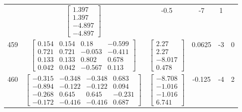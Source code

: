 \documentclass[a4paper,12pt]{article}
\begin{document}
\begin{tabular}{c c c c c c}
&
$\begin{bmatrix} 1.397 \\ 1.397 \\ -4.897 \\ -4.897 \end{bmatrix}$
&
-0.5
&
-7
&
1
\\
459
&
$\begin{bmatrix} 0.154 & 0.154 & 0.18 & -0.599 \\ 0.721 & 0.721 & -0.053 & -0.411 \\ 0.133 & 0.133 & 0.802 & 0.678 \\ 0.042 & 0.042 & -0.567 & 0.113 \end{bmatrix}$
&
$\begin{bmatrix} 2.27 \\ 2.27 \\ -8.017 \\ 0.478 \end{bmatrix}$
&
0.0625
&
-3
&
0
\\
460
&
$\begin{bmatrix} -0.315 & -0.348 & -0.348 & 0.683 \\ -0.894 & -0.122 & -0.122 & 0.094 \\ -0.268 & 0.645 & 0.645 & -0.231 \\ -0.172 & -0.416 & -0.416 & 0.687 \end{bmatrix}$
&
$\begin{bmatrix} -8.708 \\ -1.016 \\ -1.016 \\ 6.741 \end{bmatrix}$
&
-0.125
&
-4
&
2
\\
\end{tabular} \egroup \newpage
\end{document}
